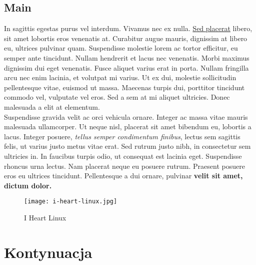 \documentclass[12pt,a4paper]{article}
\begin{document}
	\subsection{Main}
	\label{Main}
	In sagittis egestas purus vel interdum. Vivamus nec ex nulla. \underline{Sed placerat}  libero, sit amet lobortis eros venenatis at. Curabitur augue mauris, dignissim at libero eu, ultrices pulvinar quam. Suspendisse molestie lorem ac tortor efficitur, eu semper ante tincidunt. Nullam hendrerit et lacus nec venenatis. Morbi maximus dignissim dui eget venenatis. Fusce aliquet varius erat in porta. Nullam fringilla arcu nec enim lacinia, et volutpat mi varius. Ut ex dui, molestie sollicitudin pellentesque vitae, euismod ut massa. Maecenas turpis dui, porttitor tincidunt commodo vel, vulputate vel eros. Sed a sem at mi aliquet ultricies. Donec malesuada a elit at elementum. \\Suspendisse gravida velit ac orci vehicula ornare. Integer ac massa vitae mauris malesuada ullamcorper. Ut neque nisl, placerat sit amet bibendum eu, lobortis a lacus. Integer posuere, \textit{tellus semper condimentum finibus}, lectus sem sagittis felis, ut varius justo metus vitae erat. Sed rutrum justo nibh, in consectetur sem ultricies in. In faucibus turpis odio, ut consequat est lacinia eget. Suspendisse rhoncus urna lectus. Nam placerat neque eu posuere rutrum. Praesent posuere eros eu ultrices tincidunt. Pellentesque a dui ornare, pulvinar  \textbf{velit sit amet, dictum dolor.}
	\begin{figure}[H]
		\centering
		\texttt{[image: i-heart-linux.jpg]}
		\caption{I Heart Linux}
		\label{fig: IHeartLInux}
	\end{figure}
	
\section{Kontynuacja}
\end{document}
